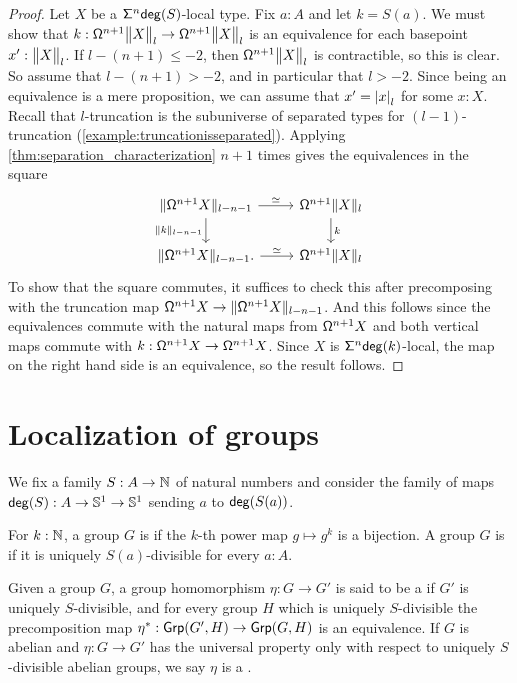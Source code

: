 \begin{proof}
    Let $X$ be a $\suspsym^n \degg(S)$-local type.
    Fix $a : A$ and let $k = S(a)$.
    We must show that $k : \loopspacesym^{n+1} \ttrunc{l}{X} \to \loopspacesym^{n+1} \ttrunc{l}{X}$
    is an equivalence for each basepoint $x' : \ttrunc{l}{X}$.
    If $l - (n+1) \leq -2$, then $\loopspacesym^{n+1} \ttrunc{l}{X}$ is
    contractible, so this is clear.
    So assume that $l - (n+1) > -2$, and in particular that $l > -2$.
    Since being an equivalence is a mere proposition,
    we can assume that $x' = \tproj{l}{x}$ for some $x : X$.
    Recall that $l$-truncation
    is the subuniverse of separated types for $(l-1)$-truncation (\cref{example:truncationisseparated}).
    Applying \cref{thm:separation_characterization} $n+1$ times gives the equivalences
    in the square
\begin{equation*}
\begin{tikzcd}
\trunc{l-n-1}{\loopspacesym^{n+1} X} \arrow[d,swap,"\trunc{l-n-1}{k}"] \arrow[r,"\eqvsym"] & \loopspacesym^{n+1} \trunc{l}X \arrow[d,"k"] \\
\trunc{l-n-1}{\loopspacesym^{n+1} X}. \arrow[r,"\eqvsym"] & \loopspacesym^{n+1} \trunc{l} X
\end{tikzcd}
\end{equation*}
    To show that the square commutes, it suffices to check this after precomposing
    with the truncation map $\loopspacesym^{n+1} X \to \trunc{l-n-1}{\loopspacesym^{n+1} X}$.
    And this follows since the equivalences commute with the natural maps from
    $\loopspacesym^{n+1} X$ and
    both vertical maps commute with $k : \loopspacesym^{n+1} X \to \loopspacesym^{n+1} X$.
    Since $X$ is $\suspsym^n \degg(k)$-local, the map on the right hand side is an equivalence,
    so the result follows.
\end{proof}

\section{Localization of groups}\label{ss:localizationofgroups}

We fix a family $S : A \to \N$ of natural numbers and consider the family
of maps $\degg(S) : A \to \sphere{1} \to \sphere{1}$ sending $a$ to $\degg(S(a))$.

\begin{defn}
    For $k : \N$, a group $G$ is  if the $k$-th power map
    $g \mapsto g^k$ is a bijection.
    A group $G$ is  if it is uniquely $S(a)$-divisible for every $a : A$.

    Given a group $G$, a group homomorphism $\eta : G \to G'$ is said to be a  if $G'$ is uniquely $S$-divisible, and for every group $H$
    which is uniquely $S$-divisible the precomposition map $\precomp{\eta} : \mathsf{Grp}(G', H) \to \mathsf{Grp}(G, H)$ is an equivalence.
    If $G$ is abelian and $\eta : G \to G'$ has the universal property only with respect to uniquely
    $S$-divisible abelian groups, we say $\eta$ is a .
\end{defn}


